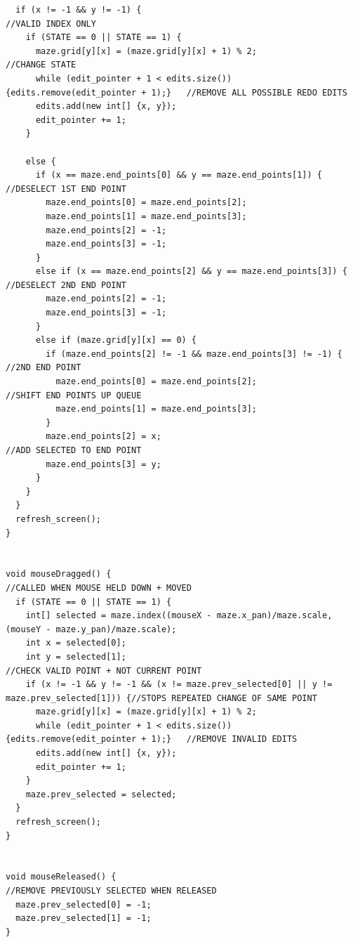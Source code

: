 \documentclass[titlepage]{article}
\begin{document}
\begin{changemargin}{-1in}{-1in}
\begin{verbatim}
  if (x != -1 && y != -1) {                                                       //VALID INDEX ONLY
    if (STATE == 0 || STATE == 1) {
      maze.grid[y][x] = (maze.grid[y][x] + 1) % 2;                                //CHANGE STATE
      while (edit_pointer + 1 < edits.size()) {edits.remove(edit_pointer + 1);}   //REMOVE ALL POSSIBLE REDO EDITS
      edits.add(new int[] {x, y});
      edit_pointer += 1;
    }

    else {                                                           
      if (x == maze.end_points[0] && y == maze.end_points[1]) {                   //DESELECT 1ST END POINT
        maze.end_points[0] = maze.end_points[2];    
        maze.end_points[1] = maze.end_points[3];
        maze.end_points[2] = -1;
        maze.end_points[3] = -1;
      }
      else if (x == maze.end_points[2] && y == maze.end_points[3]) {              //DESELECT 2ND END POINT
        maze.end_points[2] = -1;
        maze.end_points[3] = -1;
      }
      else if (maze.grid[y][x] == 0) {
        if (maze.end_points[2] != -1 && maze.end_points[3] != -1) {               //2ND END POINT
          maze.end_points[0] = maze.end_points[2];                                //SHIFT END POINTS UP QUEUE
          maze.end_points[1] = maze.end_points[3];
        }
        maze.end_points[2] = x;                                                   //ADD SELECTED TO END POINT
        maze.end_points[3] = y;
      }
    }
  }
  refresh_screen();
}


void mouseDragged() {                                                             //CALLED WHEN MOUSE HELD DOWN + MOVED
  if (STATE == 0 || STATE == 1) {
    int[] selected = maze.index((mouseX - maze.x_pan)/maze.scale, (mouseY - maze.y_pan)/maze.scale);
    int x = selected[0];
    int y = selected[1];                                                          //CHECK VALID POINT + NOT CURRENT POINT
    if (x != -1 && y != -1 && (x != maze.prev_selected[0] || y != maze.prev_selected[1])) {//STOPS REPEATED CHANGE OF SAME POINT
      maze.grid[y][x] = (maze.grid[y][x] + 1) % 2;
      while (edit_pointer + 1 < edits.size()) {edits.remove(edit_pointer + 1);}   //REMOVE INVALID EDITS
      edits.add(new int[] {x, y});
      edit_pointer += 1;
    }
    maze.prev_selected = selected;
  }
  refresh_screen();
}


void mouseReleased() {                                                             //REMOVE PREVIOUSLY SELECTED WHEN RELEASED
  maze.prev_selected[0] = -1;
  maze.prev_selected[1] = -1;
}
\end{verbatim}
\end{changemargin} 
\end{document}
